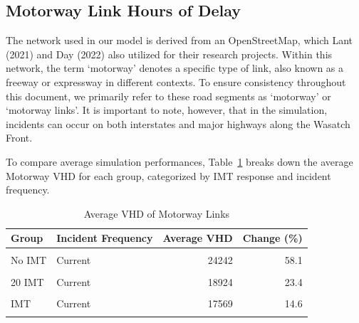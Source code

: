 \documentclass[fancy, oneside, mastersfancy, ms]{byuthesis}
\begin{document}
\hypertarget{motorway-link-hours-of-delay}{%
\subsection{Motorway Link Hours of
Delay}\label{motorway-link-hours-of-delay}}

The network used in our model is derived from an OpenStreetMap, which
Lant (2021) and Day (2022) also utilized for their research projects.
Within this network, the term `motorway' denotes a specific type of
link, also known as a freeway or expressway in different contexts. To
ensure consistency throughout this document, we primarily refer to these
road segments as `motorway' or `motorway links'. It is important to
note, however, that in the simulation, incidents can occur on both
interstates and major highways along the Wasatch Front.

To compare average simulation performances,
Table~\ref{tbl-motorway_delays_table} breaks down the average Motorway
VHD for each group, categorized by IMT response and incident frequency.

\hypertarget{tbl-motorway_delays_table}{}
\begin{table}
\caption{\label{tbl-motorway_delays_table}Average VHD of Motorway Links }\tabularnewline

\centering
\begin{tabular}[t]{llrr}
\toprule
\textbf{Group} & \textbf{Incident Frequency} & \textbf{Average VHD} & \textbf{Change (\%)}\\
\midrule
\cellcolor{gray!6}{Baseline} & \cellcolor{gray!6}{-} & \cellcolor{gray!6}{15335} & \cellcolor{gray!6}{0.0}\\
No IMT & Current & 24242 & 58.1\\
\cellcolor{gray!6}{No IMT} & \cellcolor{gray!6}{Increased} & \cellcolor{gray!6}{22321} & \cellcolor{gray!6}{45.6}\\
20 IMT & Current & 18924 & 23.4\\
\cellcolor{gray!6}{20 IMT} & \cellcolor{gray!6}{Increased} & \cellcolor{gray!6}{19176} & \cellcolor{gray!6}{25.0}\\
\addlinespace
30 IMT & Current & 17569 & 14.6\\
\cellcolor{gray!6}{30 IMT} & \cellcolor{gray!6}{Increased} & \cellcolor{gray!6}{18327} & \cellcolor{gray!6}{19.5}\\
\bottomrule
\end{tabular}
\end{table}
\end{document}
